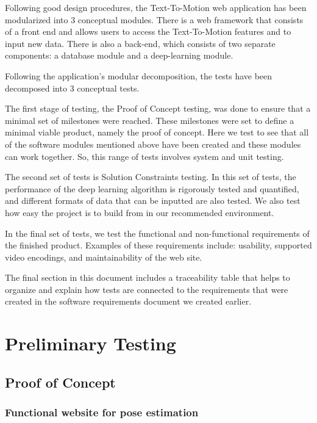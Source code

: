 \documentclass{scrreprt}
\begin{document}
Following good design procedures, the Text-To-Motion web application has been
modularized into $3$ conceptual modules.  There is a web framework that
consists of a front end and allows users to access the Text-To-Motion
features and to input new data.  There is also a back-end, which consists of two
separate components: a database module and a deep-learning module.

Following the application's modular decomposition, the tests have been
decomposed into $3$ conceptual tests.

The first stage of testing, the Proof of Concept testing, was done to ensure
that a minimal set of milestones were reached.  These milestones were set to
define a minimal viable product, namely the proof of concept.  Here we test to
see that all of the software modules mentioned above have been created and
these modules can work together.  So, this range of tests involves system and
unit testing.

The second set of tests is Solution Constraints testing.  In this set of
tests, the performance of the deep learning algorithm is rigorously tested
and quantified, and different formats of data that can be inputted are also
tested.  We also test how easy the project is to build from in our recommended
environment.

In the final set of tests, we test the functional and non-functional requirements
of the finished product. Examples of these requirements include: usability,
supported video encodings, and maintainability of the web site.

The final section in this document includes a traceability table that helps to
organize and explain how tests are connected to the requirements that were
created in the software requirements document we created earlier.

\chapter{Preliminary Testing}

\section{Proof of Concept}
\subsection{Functional website for pose estimation}
\end{document}
